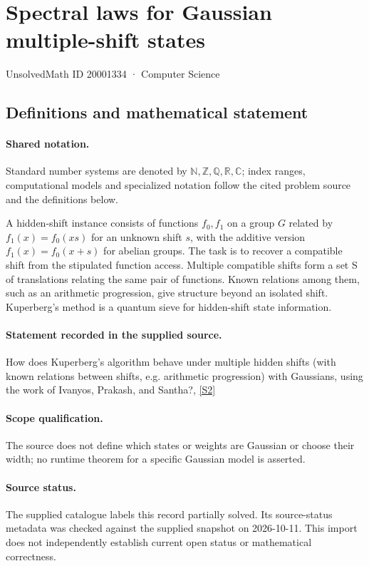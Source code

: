 \documentclass[11pt]{article}
\newcommand{\sref}[2]{\hyperlink{source:#1:#2}{[S#2]}}
\begin{document}
\setcounter{section}{20001333}
\section{Spectral laws for Gaussian multiple-shift states}\label{20001334}
{\small\sffamily UnsolvedMath ID 20001334 · Computer Science}
\subsection{Definitions and mathematical statement}

\paragraph{Shared notation.}Standard number systems are denoted by $\mathbb N,\mathbb Z,\mathbb Q,\mathbb R,\mathbb C$; index ranges, computational models and specialized notation follow the cited problem source and the definitions below.


A hidden-shift instance consists of functions $f_0,f_1$ on a group $G$ related by $f_1(x)=f_0(xs)$ for an unknown shift $s$, with the additive version $f_1(x)=f_0(x+s)$ for abelian groups. The task is to recover a compatible shift from the stipulated function access. Multiple compatible shifts form a set S of translations relating the same pair of functions. Known relations among them, such as an arithmetic progression, give structure beyond an isolated shift. Kuperberg's method is a quantum sieve for hidden-shift state information.
\paragraph{Statement recorded in the supplied source.}
How does Kuperberg's algorithm behave under multiple hidden shifts (with known relations between shifts, e.g. arithmetic progression) with Gaussians, using the work of Ivanyos, Prakash, and Santha?, \sref{20001334}{2}
\paragraph{Scope qualification.}
The source does not define which states or weights are Gaussian or choose their width; no runtime theorem for a specific Gaussian model is asserted.
\paragraph{Source status.}
The supplied catalogue labels this record partially solved. Its source-status metadata was checked against the supplied snapshot on 2026-10-11. This import does not independently establish current open status or mathematical correctness.
\end{document}
